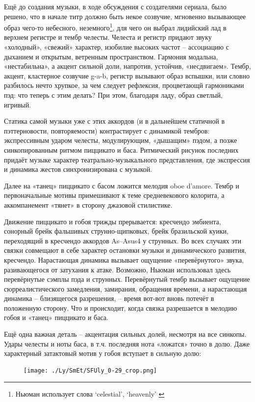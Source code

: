 Ещё до создания музыки, в ходе обсуждения с создателями сериала, было решено, что в начале титр должно быть некое созвучие, мгновенно вызывающее образ чего-то небесного, неземного\footnote{Ньюман использует слова `celestial', `heavenly' \autocite{TN.SFU.2011}}, для чего он выбрал лидийский лад в верхнем регистре и тембр челесты.
Челеста и регистр придают звуку «холодный», «свежий» характер, изобилие высоких частот -- ассоциацию с дыханием и открытым, ветренным пространством.
Гармония модальна, «нестабильна», а акцент сильной доли, напротив, устойчив, «несдвигаем».
Тембр, акцент, кластерное созвучие g-a-b, регистр вызывают образ вспышки, или словно разбилось нечто хрупкое, за чем следует рефлексия, процветающй гармониками пэд: что теперь с этим делать?
При этом, благодаря ладу, образ светлый, игривый.

Статика самой музыки уже с этих аккордов (и в дальнейшем статичной в пэттерновости, повторяемости) контрастирует с динамикой тембров: экспрессивным ударом челесты, модулирующим, «дышащим» пэдом, а позже синкопированным ритмом пиццикато и баса.
Ритмический рисунок последних придаёт музыке характер театрально-музыкального представления, где экспрессия и динамика жестов синхронизирована с музыкой.

Далее на «танец» пиццикато с басом ложится мелодия oboe d'amore.
Тембр и первоначальные мотивы примешивают к теме средневекового колорита, а аккомпанемент «тянет» в сторону джазовой стилистике.

Движение пиццикато и гобоя трижды прерывается: кресчендо эмбиента, сонорный брейк фальшивых струнно-щипковых, брейк бразильской куики, переходящий в кресчендо аккордов As--Asus4 у струнных.
Во всех случаях эти связки совмещают в себе характер остановки музыки и динамического развития, кресчендо.
Нарастающая динамика вызывает ощущение «перевёрнутого» звука, разивающегося от затухания к атаке.
Возможно, Ньюман использовал здесь перевёрнутые сэмплы пэда и струнных.
Перевёрнутый тембр вызывает ощущение сюрреалистического замедления, замирания, обращения времени, а нарастающая динамика -- близящегося разрешения, -- время вот-вот вновь потечёт в положенную сторону.
Что и происходит, когда связка разрешается в мелодию гобоя и «танец» пиццикато и баса.

Ещё одна важная деталь -- акцентация сильных долей, несмотря на все синкопы.
Удары челесты и ноты баса, в т.ч. последняя нота «ложатся» точно в долю.
Даже характерный затактовый мотив у гобоя вступает в сильную долю:

\begin{figure}
\centering
\texttt{[image: ./Ly/SmEt/SFUly\_0-29\_crop.png]}
\caption{}
\end{figure}


